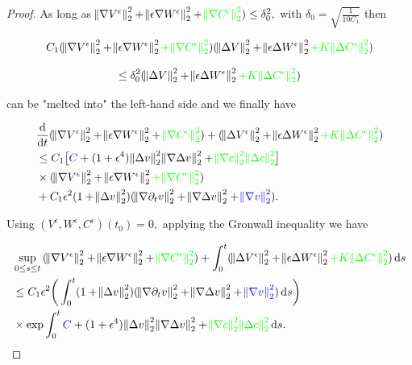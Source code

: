 \documentclass[11pt]{article}
\newcommand*\diff{\mathop{}\!\mathrm{d}}
\begin{document}
\begin{proof}
As long as $\norm{\nabla V^\epsilon}^2_2 + \norm{\epsilon \nabla W^\epsilon}^2_2 + \textcolor{green}{\norm{\nabla C^\epsilon}^2_2}) \leq \delta_0^2,$ with $\delta_0 = \sqrt{\frac{1}{10 C_1}}$ then 

$$ C_1 (\norm{\nabla V^\epsilon}^2_2 + \norm{\epsilon \nabla W^\epsilon}^2_2 \textcolor{green}{+ \norm{\nabla C^\epsilon}^2_2})(\norm{\Delta V}^2_2 + \norm{\epsilon \Delta W^\epsilon}^2_2 \textcolor{green}{+ K \norm{\Delta C^\epsilon}_2^2}) $$

$$ \leq \delta_0^2 (\norm{\Delta V}^2_2 + \norm{\epsilon \Delta W^\epsilon}^2_2 \textcolor{green}{+ K \norm{\Delta C^\epsilon}_2^2}) $$

can be "melted into" the left-hand side and we finally have

\begin{equation}
  \begin{split}
    & \frac{\diff}{\diff t} (\norm{\nabla V^\epsilon}^2_2 + \norm{\epsilon \nabla W^\epsilon}^2_2 + \textcolor{green}{\norm{\nabla C^\epsilon}^2_2}) + (\norm{\Delta V^\epsilon}^2_2 + \norm{\epsilon \Delta W^\epsilon}^2_2 \textcolor{green}{+ K \norm{\Delta C^\epsilon}_2^2}) \\
    & \leq C_1 \big [ \textcolor{blue}{C}+ (1+ \epsilon^4) \norm{\Delta v}^2_2 \norm{\nabla \Delta v}^2_2 + \textcolor{green}{\norm{\nabla c}^2_2 \norm{\Delta c}^2_2} \big ] \\
    & \times (\norm{\nabla V^\epsilon}^2_2 + \norm{\epsilon \nabla W^\epsilon}^2_2 \textcolor{green}{+ \norm{\nabla C^\epsilon}^2_2}) \\
    & + C_1 \epsilon^2 (1 + \norm{\Delta v}^2_2) (\norm{\nabla \partial_t v}^2_2 + \norm{\nabla \Delta v}^2_2 + \textcolor{blue}{\norm{\nabla v}_2^2}).
  \end{split}
\end{equation}

Using $(V^\epsilon, W^\epsilon, C^\epsilon)(t_0) = 0,$ applying the Gronwall inequality we have 

\begin{equation} \label{result_theorem1}
  \begin{split}
    & \sup_{0 \leq s \leq t}{(\norm{\nabla V^\epsilon}^2_2 + \norm{\epsilon \nabla W^\epsilon}^2_2 + \textcolor{green}{\norm{\nabla C^\epsilon}^2_2}) } + \int_0^t (\norm{\Delta V^\epsilon}^2_2 + \norm{\epsilon \Delta W^\epsilon}^2_2 \textcolor{green}{+ K \norm{\Delta C^\epsilon}^2_2}) \diff s \\
    & \leq C_1 \epsilon^2 \bigg ( \int_0^t (1 + \norm{\Delta v}^2_2) (\norm{\nabla \partial_t v}^2_2 + \norm{\nabla \Delta v}^2_2 + \textcolor{blue}{\norm{\nabla v}_2^2}) \diff s \bigg ) \\
    & \times \exp{ \int_0^t \textcolor{blue}{C}+ (1+ \epsilon^4) \norm{\Delta v}^2_2 \norm{\nabla \Delta v}^2_2 + \textcolor{green}{\norm{\nabla c}^2_2 \norm{\Delta c}^2_2} \diff s}.
  \end{split}
\end{equation}

\end{proof}
\end{document}
